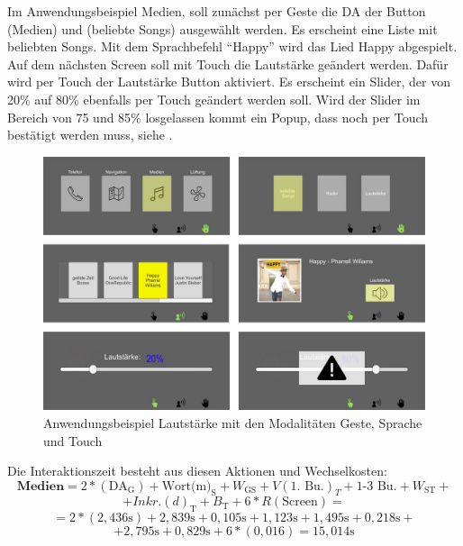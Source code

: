 Im Anwendungsbeispiel Medien, soll zunächst per Geste die DA der Button (Medien) und (beliebte Songs) ausgewählt werden. Es erscheint eine Liste mit beliebten Songs. Mit dem Sprachbefehl "`Happy"' wird das Lied Happy abgespielt. Auf dem nächsten Screen soll mit Touch die Lautstärke geändert werden. Dafür wird per Touch der Lautstärke Button aktiviert. Es erscheint ein Slider, der von 20\% auf 80\% ebenfalls per Touch geändert werden soll. Wird der Slider im Bereich von 75 und 85\% losgelassen kommt ein Popup, dass noch per Touch bestätigt werden muss, siehe .
\begin{figure}
	\centering
		\includegraphics[width=1\textwidth]{img/UseCases_Eval_Medien.jpg}
	\caption{Anwendungsbeispiel Lautstärke mit den Modalitäten Geste, Sprache und Touch}
	\label{fig:UseCasesEvalMedien}
\end{figure}
Die Interaktionszeit besteht aus diesen Aktionen und Wechselkosten:
\[
\textbf{Medien} = 2*(\text{DA}_\text{G}) + \text{Wort(m)}_\text{S} + W_\text{GS} + V(\text{1. Bu.})_T + \text{1-3 Bu.} + W_\text{ST} + 
\]
\[
 + Inkr.(d)_\text{T} + B_\text{T} + 6*R(\text{Screen}) =
\]
\[
= 2*( 2,436\text{s}) + 2,839\text{s} + 0,105\text{s} + 1,123\text{s} + 1,495\text{s} + 0,218\text{s} +
\]
\[
+2,795\text{s}+0,829\text{s} + 6*(0,016) = 15,014\text{s}
\]


